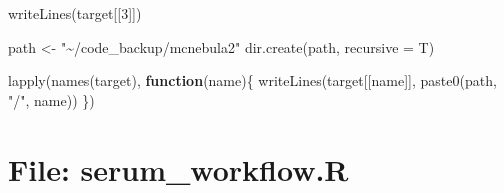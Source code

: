 \documentclass[
]{article}
\newenvironment{Shaded}{\begin{snugshade}}{\end{snugshade}}
\newcommand{\AttributeTok}[1]{\textcolor[rgb]{0.77,0.63,0.00}{#1}}
\newcommand{\ControlFlowTok}[1]{\textcolor[rgb]{0.13,0.29,0.53}{\textbf{#1}}}
\newcommand{\DecValTok}[1]{\textcolor[rgb]{0.00,0.00,0.81}{#1}}
\newcommand{\FunctionTok}[1]{\textcolor[rgb]{0.00,0.00,0.00}{#1}}
\newcommand{\NormalTok}[1]{#1}
\newcommand{\OtherTok}[1]{\textcolor[rgb]{0.56,0.35,0.01}{#1}}
\newcommand{\StringTok}[1]{\textcolor[rgb]{0.31,0.60,0.02}{#1}}
\begin{document}
\begin{Shaded}
\begin{Highlighting}[]
\FunctionTok{writeLines}\NormalTok{(target[[}\DecValTok{3}\NormalTok{]])}

\NormalTok{path }\OtherTok{\textless{}{-}} \StringTok{"\textasciitilde{}/code\_backup/mcnebula2"}
\FunctionTok{dir.create}\NormalTok{(path, }\AttributeTok{recursive =}\NormalTok{ T)}

\FunctionTok{lapply}\NormalTok{(}\FunctionTok{names}\NormalTok{(target),}
       \ControlFlowTok{function}\NormalTok{(name)\{}
         \FunctionTok{writeLines}\NormalTok{(target[[name]], }\FunctionTok{paste0}\NormalTok{(path, }\StringTok{"/"}\NormalTok{, name))}
\NormalTok{       \})}
\end{Highlighting}
\end{Shaded}

\hypertarget{file-serum_workflow.r}{%
\section{File: serum\_workflow.R}\label{file-serum_workflow.r}}
\end{document}
